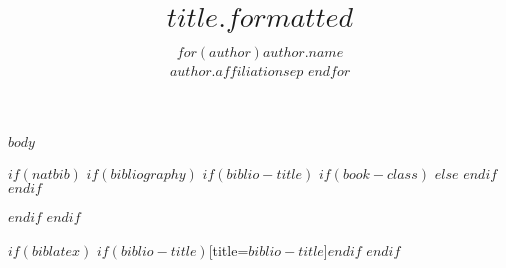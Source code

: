 \documentclass[
$for(classoption)$
  $classoption$$sep$,
$endfor$
]{$documentclass$}
\author{
$for(author)$$author.name$\\$author.affiliation$$sep$ \And $endfor$
}
\title{$title.formatted$}
\begin{document}
$body$

$if(natbib)$
$if(bibliography)$
$if(biblio-title)$
$if(book-class)$
\renewcommand\bibname{$biblio-title$}
$else$
\renewcommand\refname{$biblio-title$}
$endif$
$endif$

$endif$
$endif$

$if(biblatex)$
\printbibliography$if(biblio-title)$[title=$biblio-title$]$endif$
$endif$
\end{document}

